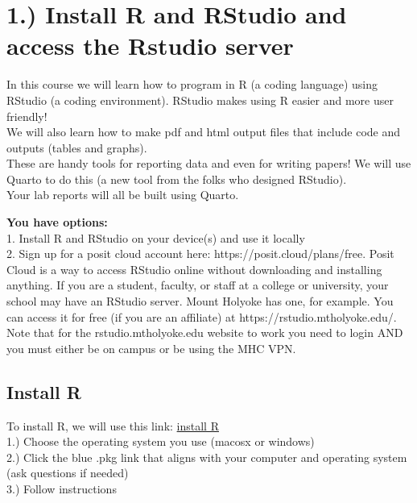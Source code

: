 \documentclass[
  letterpaper,
  DIV=11,
  numbers=noendperiod]{scrartcl}
\begin{document}
\hypertarget{install-r-and-rstudio-and-access-the-rstudio-server}{%
\section{\texorpdfstring{\textbf{1.) Install R and RStudio and access
the Rstudio
server}}{1.) Install R and RStudio and access the Rstudio server}}\label{install-r-and-rstudio-and-access-the-rstudio-server}}

In this course we will learn how to program in R (a coding language)
using RStudio (a coding environment). RStudio makes using R easier and
more user friendly!\\
We will also learn how to make pdf and html output files that include
code and outputs (tables and graphs).\\
These are handy tools for reporting data and even for writing papers! We
will use Quarto to do this (a new tool from the folks who designed
RStudio).\\
Your lab reports will all be built using Quarto.

\textbf{You have options:}\\
1. Install R and RStudio on your device(s) and use it locally\\
2. Sign up for a posit cloud account here:
https://posit.cloud/plans/free. Posit Cloud is a way to access RStudio
online without downloading and installing anything. If you are a
student, faculty, or staff at a college or university, your school may
have an RStudio server. Mount Holyoke has one, for example. You can
access it for free (if you are an affiliate) at
https://rstudio.mtholyoke.edu/. Note that for the rstudio.mtholyoke.edu
website to work you need to login AND you must either be on campus or be
using the MHC VPN.\\

\subsection{\texorpdfstring{\textbf{Install R}}{Install R}}

To install R, we will use this link:
\href{https://cran.r-project.org/bin/}{install R}\\
1.) Choose the operating system you use (macosx or windows)\\
2.) Click the blue .pkg link that aligns with your computer and
operating system (ask questions if needed)\\
3.) Follow instructions
\end{document}
